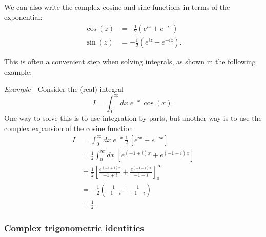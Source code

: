 \documentclass[10pt,a4paper]{article}
\begin{document}
We can also write the complex cosine and sine functions in terms of
the exponential:
\begin{align}
  \cos(z) &= \;\;\frac{1}{2}\left(e^{iz} + e^{-iz}\right) \label{cosz}\\
  \sin(z) &= -\frac{i}{2}\left(e^{iz} - e^{-iz}\right). \label{sinz}
\end{align}

This is often a convenient step when solving integrals, as shown in
the following example:

\begin{framed} \noindent
  \textit{Example}---Consider the (real) integral
\begin{equation*}
  I = \int_0^\infty dx \; e^{- x} \, \cos(x).
\end{equation*}
One way to solve this is to use integration by parts, but another way
is to use the complex expansion of the cosine
function:
\begin{align*}
  I &= \int_0^\infty dx \; e^{- x}
\,\frac{1}{2}\, \left[e^{ix} + e^{-ix}\right] \\ &= \frac{1}{2}
\int_0^\infty dx \; \left[e^{(-1+i)x} + e^{(-1-i)x}\right] \\ &=
\frac{1}{2} \left[ \frac{e^{(-1+i) x}}{-1+i} + \frac{e^{(-1 - i)
      x}}{-1 - i}\right]_0^\infty \\ &= -\frac{1}{2}
\left(\frac{1}{-1+i} + \frac{1}{-1 - i}\right) \\ &=
\frac{1}{2}.
\end{align*}
\end{framed}
     
\subsubsection{Complex trigonometric identities}
\end{document}
